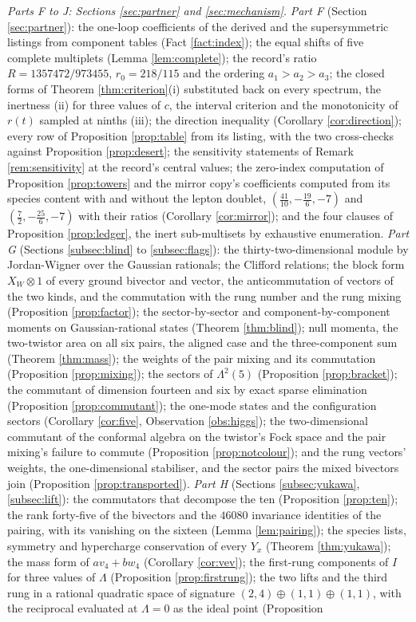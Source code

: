 \documentclass[11pt]{article}
\theoremstyle{definition}
\begin{document}
\emph{Parts F to J: Sections \ref{sec:partner} and \ref{sec:mechanism}.} \emph{Part F} (Section \ref{sec:partner}): the one-loop coefficients of the derived and the supersymmetric listings from component tables (Fact \ref{fact:index}); the equal shifts of five complete multiplets (Lemma \ref{lem:complete}); the record's ratio $R = 1357472/973455$, $r_{0} = 218/115$ and the ordering $a_{1} > a_{2} > a_{3}$; the closed forms of Theorem \ref{thm:criterion}(i) substituted back on every spectrum, the inertness (ii) for three values of $c$, the interval criterion and the monotonicity of $r(t)$ sampled at ninths (iii); the direction inequality (Corollary \ref{cor:direction}); every row of Proposition \ref{prop:table} from its listing, with the two cross-checks against Proposition \ref{prop:desert}; the sensitivity statements of Remark \ref{rem:sensitivity} at the record's central values; the zero-index computation of Proposition \ref{prop:towers} and the mirror copy's coefficients computed from its species content with and without the lepton doublet, $(\tfrac{41}{10}, -\tfrac{19}{6}, -7)$ and $(\tfrac72, -\tfrac{25}{6}, -7)$ with their ratios (Corollary \ref{cor:mirror}); and the four clauses of Proposition \ref{prop:ledger}, the inert sub-multisets by exhaustive enumeration. \emph{Part G} (Sections \ref{subsec:blind} to \ref{subsec:flags}): the thirty-two-dimensional module by Jordan-Wigner over the Gaussian rationals; the Clifford relations; the block form $X_{W} \otimes 1$ of every ground bivector and vector, the anticommutation of vectors of the two kinds, and the commutation with the rung number and the rung mixing (Proposition \ref{prop:factor}); the sector-by-sector and component-by-component moments on Gaussian-rational states (Theorem \ref{thm:blind}); null momenta, the two-twistor area on all six pairs, the aligned case and the three-component sum (Theorem \ref{thm:mass}); the weights of the pair mixing and its commutation (Proposition \ref{prop:mixing}); the sectors of $\Lambda^{2}(5)$ (Proposition \ref{prop:bracket}); the commutant of dimension fourteen and six by exact sparse elimination (Proposition \ref{prop:commutant}); the one-mode states and the configuration sectors (Corollary \ref{cor:five}, Observation \ref{obs:higgs}); the two-dimensional commutant of the conformal algebra on the twistor's Fock space and the pair mixing's failure to commute (Proposition \ref{prop:notcolour}); and the rung vectors' weights, the one-dimensional stabiliser, and the sector pairs the mixed bivectors join (Proposition \ref{prop:transported}). \emph{Part H} (Sections \ref{subsec:yukawa}, \ref{subsec:lift}): the commutators that decompose the ten (Proposition \ref{prop:ten}); the rank forty-five of the bivectors and the $46080$ invariance identities of the pairing, with its vanishing on the sixteen (Lemma \ref{lem:pairing}); the species lists, symmetry and hypercharge conservation of every $Y_{x}$ (Theorem \ref{thm:yukawa}); the mass form of $a v_{4} + b w_{4}$ (Corollary \ref{cor:vev}); the first-rung components of $I$ for three values of $\Lambda$ (Proposition \ref{prop:firstrung}); the two lifts and the third rung in a rational quadratic space of signature $(2,4) \oplus (1,1) \oplus (1,1)$, with the reciprocal evaluated at $\Lambda = 0$ as the ideal point (Proposition 
\end{document}
